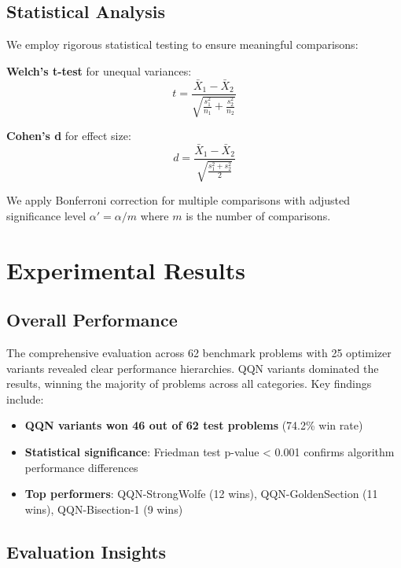 \hypertarget{statistical-analysis}{%
\subsection{Statistical Analysis}\label{statistical-analysis}}

We employ rigorous statistical testing to ensure meaningful comparisons:

\textbf{Welch's t-test} for unequal variances:
\[t = \frac{\bar{X}_1 - \bar{X}_2}{\sqrt{\frac{s_1^2}{n_1} + \frac{s_2^2}{n_2}}}\]

\textbf{Cohen's d} for effect size:
\[d = \frac{\bar{X}_1 - \bar{X}_2}{\sqrt{\frac{s_1^2 + s_2^2}{2}}}\]

We apply Bonferroni correction for multiple comparisons with adjusted significance level \(\alpha' = \alpha / m\) where \(m\) is the number of comparisons.

\hypertarget{experimental-results}{%
\section{Experimental Results}\label{experimental-results}}

\hypertarget{overall-performance}{%
\subsection{Overall Performance}\label{overall-performance}}

The comprehensive evaluation across 62 benchmark problems with 25 optimizer variants revealed clear performance hierarchies. QQN variants dominated the results, winning the majority of problems across all categories. Key findings include:

\begin{itemize}
\tightlist
\item
  \textbf{QQN variants won 46 out of 62 test problems} (74.2\% win rate)
\item
  \textbf{Statistical significance}: Friedman test p-value \textless{} 0.001 confirms algorithm performance differences
\item
  \textbf{Top performers}: QQN-StrongWolfe (12 wins), QQN-GoldenSection (11 wins), QQN-Bisection-1 (9 wins)
\end{itemize}

\hypertarget{evaluation-insights}{%
\subsection{Evaluation Insights}\label{evaluation-insights}}


